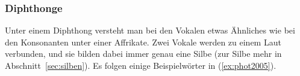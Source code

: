 %
%
%
%

\subsubsection{Diphthonge}

\label{sec:diphthonge}


Unter einem Diphthong versteht man bei den Vokalen etwas Ähnliches wie bei den Konsonanten unter einer Affrikate.
Zwei Vokale werden zu einem Laut verbunden, und sie bilden dabei immer genau eine Silbe (zur Silbe mehr in Abschnitt~\ref{sec:silben}).
Es folgen einige Beispielwörter in (\ref{ex:phot2005}).

